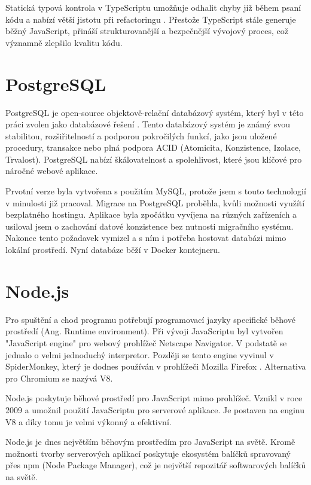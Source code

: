 Statická typová kontrola v TypeScriptu umožňuje odhalit chyby již během psaní kódu a nabízí větší jistotu při refactoringu \cite{enwiki:1258410189}. Přestože TypeScript stále generuje běžný JavaScript, přináší strukturovanější a bezpečnější vývojový proces, což významně zlepšilo kvalitu kódu.

\section{PostgreSQL}
PostgreSQL je open-source objektově-relační databázový systém, který byl v této práci zvolen jako databázové řešení \cite{postgresqlPostgreSQL}. Tento databázový systém je známý svou stabilitou, rozšiřitelností a podporou pokročilých funkcí, jako jsou uložené procedury, transakce nebo plná podpora ACID (Atomicita, Konzistence, Izolace, Trvalost). PostgreSQL nabízí škálovatelnost a spolehlivost, které jsou klíčové pro náročné webové aplikace.

Prvotní verze byla vytvořena s použitím MySQL, protože jsem s touto technologií v minulosti již pracoval. Migrace na PostgreSQL proběhla, kvůli možnosti využítí bezplatného hostingu. Aplikace byla zpočátku vyvíjena na různých zařízeních a usiloval jsem o zachování datové konzistence bez nutnosti migračního systému. Nakonec tento požadavek vymizel a s ním i potřeba hostovat databázi mimo lokální prostředí. Nyní databáze běží v Docker kontejneru.

\section{Node.js}
Pro spuštění a chod programu potřebují programovací jazyky specifické běhové prostředí (Ang. Runtime environment)\cite{enwiki:1245152116}. Při vývoji JavaScriptu byl vytvořen "JavaScript engine" pro webový prohlížeč Netscape Navigator. V podstatě se jednalo o velmi jednoduchý interpretor. Později se tento engine vyvinul v SpiderMonkey, který je dodnes používán v prohlížeči Mozilla Firefox \cite{newJavaScriptEngineModuleOwner}. Alternativa pro Chromium se nazývá V8\cite{v8JavaScriptEngine}.

Node.js poskytuje běhové prostředí pro JavaScript mimo prohlížeč. Vznikl v roce 2009 a umožnil použití JavaScriptu pro serverové aplikace. Je postaven na enginu V8 a díky tomu je velmi výkonný a efektivní.\cite{nodejsNodejsAbout}

Node.js je dnes největším běhovým prostředím pro JavaScript na světě. Kromě možnosti tvorby serverových aplikací poskytuje ekosystém balíčků spravovaný přes npm (Node Package Manager), což je největší repozitář softwarových balíčků na světě.\cite{npmjsAboutDocs}

